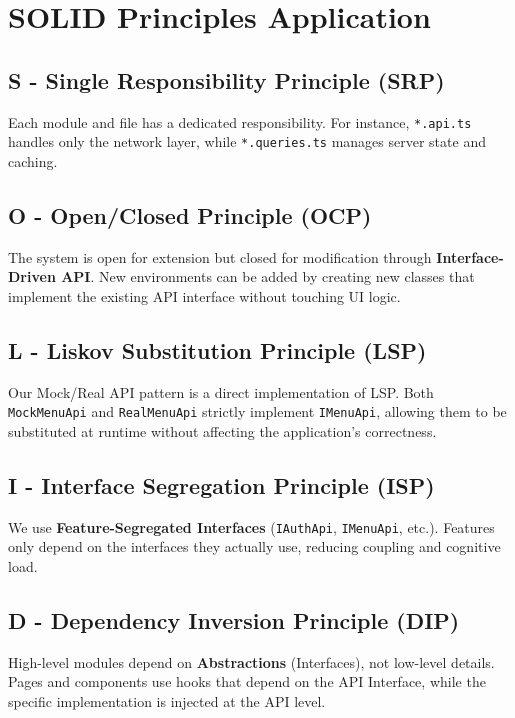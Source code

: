 \documentclass{article}
\begin{document}
\section{SOLID Principles Application}

\subsection{S - Single Responsibility Principle (SRP)}
Each module and file has a dedicated responsibility. For instance, \texttt{*.api.ts} handles only the network layer, while \texttt{*.queries.ts} manages server state and caching.

\subsection{O - Open/Closed Principle (OCP)}
The system is open for extension but closed for modification through \textbf{Interface-Driven API}. New environments can be added by creating new classes that implement the existing API interface without touching UI logic.

\subsection{L - Liskov Substitution Principle (LSP)}
Our Mock/Real API pattern is a direct implementation of LSP. Both \texttt{MockMenuApi} and \texttt{RealMenuApi} strictly implement \texttt{IMenuApi}, allowing them to be substituted at runtime without affecting the application's correctness.

\subsection{I - Interface Segregation Principle (ISP)}
We use \textbf{Feature-Segregated Interfaces} (\texttt{IAuthApi}, \texttt{IMenuApi}, etc.). Features only depend on the interfaces they actually use, reducing coupling and cognitive load.

\subsection{D - Dependency Inversion Principle (DIP)}
High-level modules depend on \textbf{Abstractions} (Interfaces), not low-level details. Pages and components use hooks that depend on the API Interface, while the specific implementation is injected at the API level.
\end{document}
